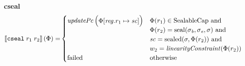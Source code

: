 \documentclass[a4paper]{article}
\begin{document}
\noindent\textbf{cseal}\\
\begin{align*}
  \sem{\tcseal{r_1}{r_2}}(\Phi) = &
                                  \begin{cases}
                                    \updPcAddr{}\left(
                                    \arraycolsep=0pt
                                    \begin{array}{rl}
                                      \Phi&\updReg{r_1}{\vsc}
                                    \end{array}\right)
&
                                    \arraycolsep=0pt
                                    \begin{array}[t]{l}
                                      \Phi(r_1) \in \SealableCaps \tand \\
                                      \Phi(r_2) = \seal{\sigma_\baddr, \sigma_\eaddr,\sigma} \tand \\
                                      \vsc = \sealed{\sigma,\Phi(r_2)} \tand\\
                                      w_2 = \linCons{\Phi(r_2)}                                                           \end{array}
                                    \\
                                    \failed & \totherwise
                                  \end{cases}
\end{align*}
\end{document}
